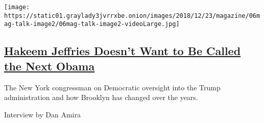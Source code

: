 \begin{enumerate}
  \texttt{[image: https://static01.graylady3jvrrxbe.onion/images/2018/12/23/magazine/06mag-talk-image2/06mag-talk-image2-videoLarge.jpg]}

  \hypertarget{hakeem-jeffries-doesnt-want-to-be-called-the-next-obama}{%
  \subsection{\texorpdfstring{\href{/2019/01/02/magazine/hakeem-jeffries-doesnt-want-to-be-called-the-next-obama.html}{Hakeem
  Jeffries Doesn't Want to Be Called the Next
  Obama}}{Hakeem Jeffries Doesn't Want to Be Called the Next Obama}}\label{hakeem-jeffries-doesnt-want-to-be-called-the-next-obama}}

  The New York congressman on Democratic oversight into the Trump
  administration and how Brooklyn has changed over the years.

  Interview by Dan Amira
\end{enumerate}

